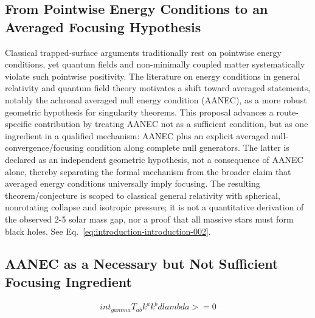 \documentclass[conference]{IEEEtran}
\begin{document}
\subsection{From Pointwise Energy Conditions to an Averaged Focusing Hypothesis}
Classical trapped-surface arguments traditionally rest on pointwise energy conditions, yet quantum fields and non-minimally coupled matter systematically violate such pointwise positivity. The literature on energy conditions in general relativity and quantum field theory motivates a shift toward averaged statements, notably the achronal averaged null energy condition (AANEC), as a more robust geometric hypothesis for singularity theorems. This proposal advances a route-specific contribution by treating AANEC not as a sufficient condition, but as one ingredient in a qualified mechanism: AANEC plus an explicit averaged null-convergence/focusing condition along complete null generators. The latter is declared as an independent geometric hypothesis, not a consequence of AANEC alone, thereby separating the formal mechanism from the broader claim that averaged energy conditions universally imply focusing. The resulting theorem/conjecture is scoped to classical general relativity with spherical, nonrotating collapse and isotropic pressure; it is not a quantitative derivation of the observed 2-5 solar mass gap, nor a proof that all massive stars must form black holes. See Eq.~\eqref{eq:introduction-introduction-002}.~\cite{cite_0ed84243cf171bc4}

\subsection{AANEC as a Necessary but Not Sufficient Focusing Ingredient}
\begin{equation}
int_{gamma} T_{ab} k^{a} k^{b} dlambda >= 0
\label{eq:introduction-introduction-002}
\end{equation}
\end{document}
